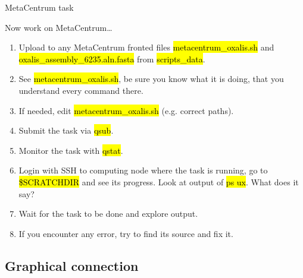 \documentclass[compress, ucs, xelatex, 11pt, xcolor=svgnames, aspectratio=169,
	hyperref={
		bookmarks=true,
		unicode=true,
		colorlinks=true,
		pdftitle={Linux, command line and MetaCentrum},
		plainpages=false,
		pdfauthor={Vojtech Zeisek},
		pdfsubject={Course about use of Linux command line, writing shell scripts and using MetaCentrum of CESNET},
		pdfcreator={XeLaTeX},
		pdfkeywords={Linux, GNU, BASH, shell, command line, MetaCentrum},
		linkcolor=DarkRed, %
		anchorcolor=DarkBlue, %
		citecolor=Indigo, %
		filecolor=NavyBlue, %
		menucolor=DarkMagenta, %
		urlcolor=DarkBlue, %
		pdftex},
	url={hyphens, lowtilde} %
	]{beamer}
\renewcommand{\texttt}[1]{\hl{\ttfamily #1}}
\begin{document}
\begin{frame}{MetaCentrum task}
	\begin{block}{Now work on MetaCentrum\ldots}
		\begin{enumerate}
			\item Upload to any MetaCentrum fronted files \texttt{metacentrum\_oxalis.sh} and \texttt{oxalis\_assembly\_6235.aln.fasta} from \texttt{scripts\_data}.
			\item See \texttt{metacentrum\_oxalis.sh}, be sure you know what it is doing, that you understand every command there.
			\item If needed, edit \texttt{metacentrum\_oxalis.sh} (e.g. correct paths).
			\item Submit the task via \texttt{qsub}.
			\item Monitor the task with \texttt{qstat}.
			\item Login with SSH to computing node where the task is running, go to \texttt{\$SCRATCHDIR} and see its progress. Look at output of \texttt{ps ux}. What does it say?
			\item Wait for the task to be done and explore output.
			\item If you encounter any error, try to find its source and fix it.
		\end{enumerate}
	\end{block}
\end{frame}

\subsection{Graphical connection}
\end{document}
